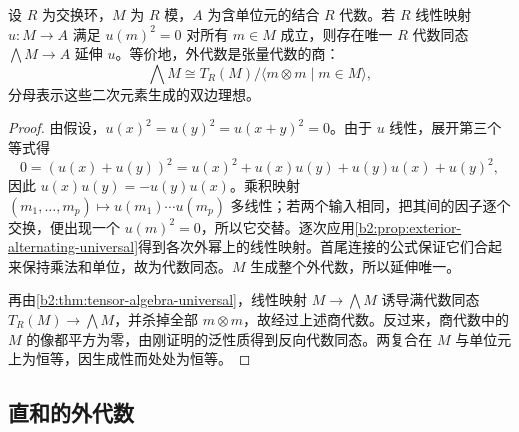 \begin{proposition}[外代数的代数泛性质]\label{b2:prop:exterior-algebra-universal}
	设 \(R\) 为交换环，\(M\) 为 \(R\) 模，\(A\) 为含单位元的结合 \(R\) 代数。若 \(R\) 线性映射 \(u:M\to A\) 满足 \(u(m)^2=0\) 对所有 \(m\in M\) 成立，则存在唯一 \(R\) 代数同态 \(\bigwedge M\to A\) 延伸 \(u\)。等价地，外代数是张量代数的商：
	\[
		\bigwedge M\cong T_R(M)/\langle m\otimes m\mid m\in M\rangle,
	\]
	分母表示这些二次元素生成的双边理想。
\end{proposition}
\begin{proof}
	由假设，\(u(x)^2=u(y)^2=u(x+y)^2=0\)。由于 \(u\) 线性，展开第三个等式得
	\[
		0=(u(x)+u(y))^2 =u(x)^2+u(x)u(y)+u(y)u(x)+u(y)^2,
	\]
	因此 \(u(x)u(y)=-u(y)u(x)\)。乘积映射 \((m_1,\ldots,m_p)\mapsto u(m_1)\cdots u(m_p)\) 多线性；若两个输入相同，把其间的因子逐个交换，便出现一个 \(u(m)^2=0\)，所以它交替。逐次应用\cref{b2:prop:exterior-alternating-universal}得到各次外幂上的线性映射。首尾连接的公式保证它们合起来保持乘法和单位，故为代数同态。\(M\) 生成整个外代数，所以延伸唯一。

	再由\cref{b2:thm:tensor-algebra-universal}，线性映射 \(M\to\bigwedge M\) 诱导满代数同态 \(T_R(M)\to\bigwedge M\)，并杀掉全部 \(m\otimes m\)，故经过上述商代数。反过来，商代数中的 \(M\) 的像都平方为零，由刚证明的泛性质得到反向代数同态。两复合在 \(M\) 与单位元上为恒等，因生成性而处处为恒等。
\end{proof}

\subsection{直和的外代数}
\label{b2:subsec:0902:03}

